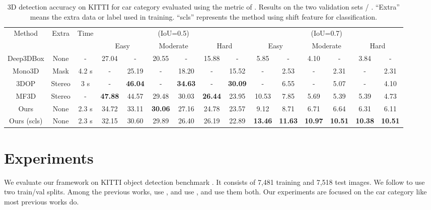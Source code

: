 \documentclass[10pt,twocolumn,letterpaper]{article}
\begin{document}
\begin{table*}[!t]
\small
\begin{center}
\begin{tabular}{| c | c | c | c@{/}c | c@{/}c | c@{/}c || c@{/}c | c@{/}c | c@{/}c |}
\hline
\multirow{2}{*}{Method} & \multirow{2}{*}{Extra} & \multirow{2}{*}{Time} & \multicolumn{6}{c||}{ (IoU=0.5)} & \multicolumn{6}{c|}{ (IoU=0.7)} \\
\cline{4-15}
& & & \multicolumn{2}{c|}{Easy} & \multicolumn{2}{c|}{Moderate} & \multicolumn{2}{c||}{Hard} & \multicolumn{2}{c|}{Easy} & \multicolumn{2}{c|}{Moderate} & \multicolumn{2}{c|}{Hard} \\
\hline     
Deep3DBox \cite{deep3dbox} & None & - & 27.04 & - & 20.55 & - & 15.88 & - & 5.85 & - & 4.10 & - & 3.84 & - \\
Mono3D \cite{mono3d} & Mask & 4.2 s & - & 25.19 & - & 18.20 & - & 15.52 & - & 2.53 & - & 2.31 & - & 2.31 \\
3DOP \cite{3dop} & Stereo & 3 s & - &  \textbf{46.04} & - &  \textbf{34.63} & - &  \textbf{30.09} & - & 6.55 & - & 5.07 & - & 4.10 \\
MF3D \cite{mfusion} & Stereo & - & \textbf{47.88} & 44.57 & 29.48 & 30.03 & \textbf{26.44} & 23.95 & 10.53 & 7.85 & 5.69 & 5.39  & 5.39 & 4.73 \\
\hline
Ours & None & 2.3 s & 34.72 & 33.11 & \textbf{30.06} & 27.16 & 24.78 & 23.57 & 9.12 & 8.71 & 6.71 & 6.64 & 6.31 & 6.11 \\ 
Ours (scls) & None & 2.3 s & 32.15  & 30.60 & 29.89  & 26.40 & 26.19 & 22.89 & \textbf{13.46} & \textbf{11.63} & \textbf{10.97} & \textbf{10.51} & \textbf{10.38} & \textbf{10.51} \\ 
\hline
\end{tabular}
\vspace{1.5mm}
\caption{3D detection accuracy on KITTI for car category evaluated using the metric of . Results on the two validation sets  / . ``Extra'' means the extra data or label used in training. ``scls'' represents the method using shift feature for classification. }
\label{tab:3d}
\end{center}
\end{table*}

\section{Experiments}

We evaluate our framework on KITTI object detection benchmark \cite{kitti}. It consists of 7,481 training and 7,518 test images. We follow \cite{deepmanta} to use two train/val splits. Among the previous works, \cite{3dvp,deep3dbox} use , and \cite{mono3d,3dop} use , and \cite{deepmanta,mfusion} use them both. Our experiments are focused on the car category like most previous works do.
\end{document}

